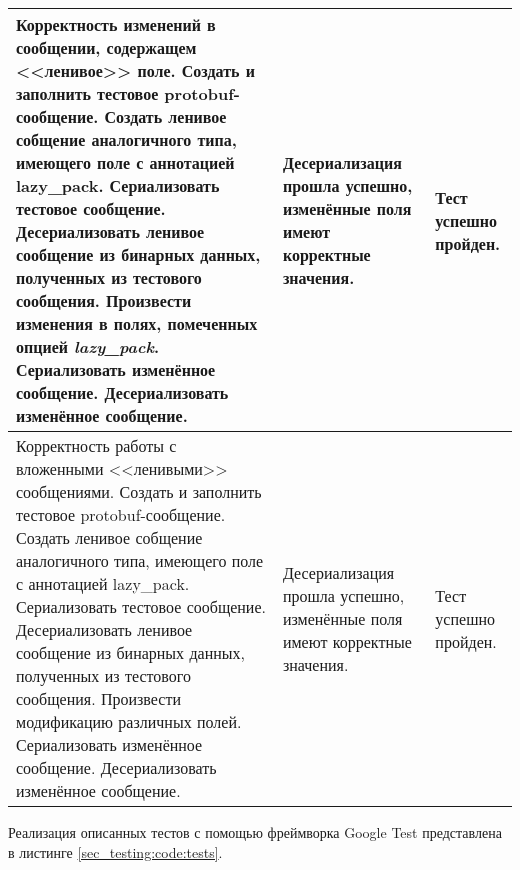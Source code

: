 \begin{longtable}{
    | >{\raggedright\arraybackslash}p{}
    | >{\raggedright\arraybackslash}p{}
    | >{\raggedright\arraybackslash}p{}|}
    Корректность изменений в сообщении, содержащем <<ленивое>> поле.
    \newline \newline
    Создать и заполнить тестовое protobuf-сообщение. \newline
    Создать ленивое собщение аналогичного типа, имеющего поле с аннотацией lazy\_pack. \newline
    Сериализовать тестовое сообщение. \newline
    Десериализовать ленивое сообщение из бинарных данных, полученных из тестового сообщения. \newline
    Произвести изменения в полях, помеченных опцией \textit{lazy\_pack}. \newline
    Сериализовать изменённое сообщение. \newline
    Десериализовать изменённое сообщение. &
    Десериализация прошла успешно, изменённые поля имеют корректные значения. &
    Тест успешно пройден. \\
    \hline

    Корректность работы с вложенными <<ленивыми>> сообщениями.
    \newline \newline
    Создать и заполнить тестовое protobuf-сообщение. \newline
    Создать ленивое собщение аналогичного типа, имеющего поле с аннотацией lazy\_pack. \newline
    Сериализовать тестовое сообщение. \newline
    Десериализовать ленивое сообщение из бинарных данных, полученных из тестового сообщения. \newline
    Произвести модификацию различных полей. \newline
    Сериализовать изменённое сообщение. \newline
    Десериализовать изменённое сообщение. &
    Десериализация прошла успешно, изменённые поля имеют корректные значения. &
    Тест успешно пройден. \\
    \hline

\end{longtable}

Реализация описанных тестов с помощью фреймворка Google Test представлена в листинге \ref{sec_testing:code:tests}.

